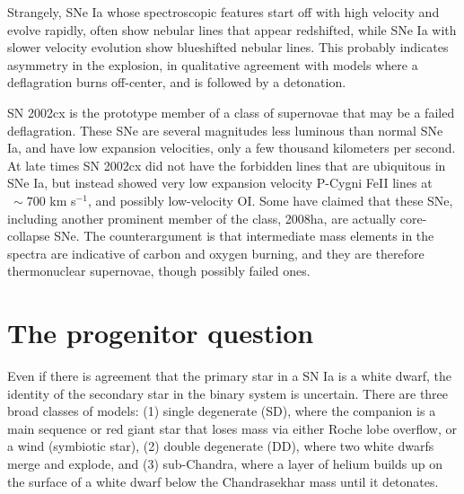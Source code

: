 \documentclass{nature1}
\begin{document}
Strangely, SNe Ia whose spectroscopic
features start off with high velocity and evolve rapidly, often show
nebular lines that appear redshifted, while SNe Ia with slower
velocity evolution show blueshifted nebular
lines\citep{2010Natur.466...82M}.  This probably indicates asymmetry
in the explosion, in qualitative agreement with models where a
deflagration burns off-center, and is followed by a detonation.

SN 2002cx is the prototype member of a class of supernovae that may be
a failed deflagration. These SNe are several magnitudes less luminous
than normal SNe Ia, and have low expansion velocities, only a few
thousand kilometers per second\citep{2003PASP..115..453L}.  At late
times SN 2002cx did not have the forbidden lines that are ubiquitous
in SNe Ia, but instead showed very low expansion velocity P-Cygni FeII
lines at $~\sim 700$ km s$^{-1}$, and possibly low-velocity
OI\citep{2006AJ....132..189J}.  Some have claimed that these SNe,
including another prominent member of the class, 2008ha, are actually
core-collapse SNe\citep{2009Natur.459..674V}.  The counterargument is
that intermediate mass elements in the spectra are indicative of
carbon and oxygen burning, and they are therefore thermonuclear
supernovae, though possibly failed ones\citep{2010ApJ...708L..61F}.

\section{The progenitor question\label{progen}}
Even if there is agreement that the primary star in a SN Ia is a white
dwarf, the identity of the secondary star in the binary system is
uncertain.  There are three broad classes of models: (1) single
degenerate\citep{1973ApJ...186.1007W} (SD), where the companion is a
main sequence or red giant star that loses mass via either Roche lobe
overflow, or a wind (symbiotic star), (2) double degenerate (DD),
where two white dwarfs merge and explode\citep{1984ApJS...54..335I,
  1984ApJ...277..355W}, and (3)
sub-Chandra\citep{1986ARA&A..24..205W}, where a layer of helium builds
up on the surface of a white dwarf below the Chandrasekhar mass until
it detonates.  

\end{document}
